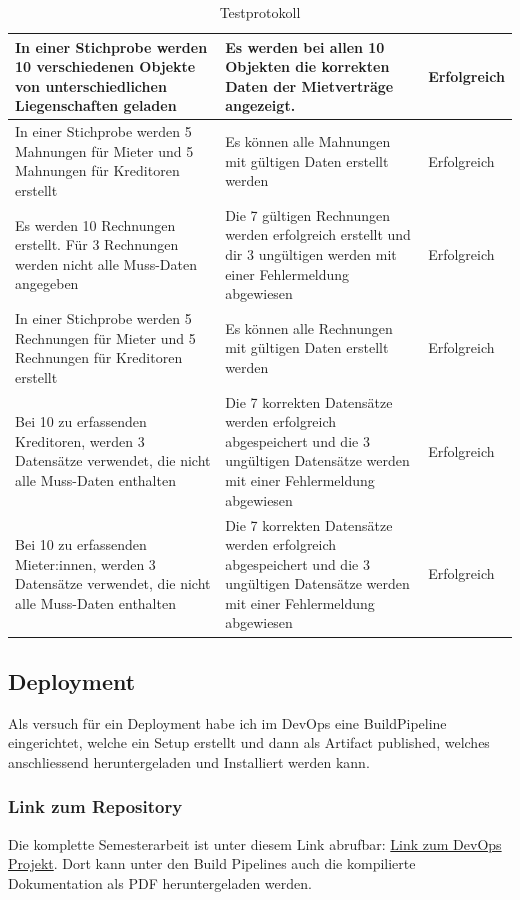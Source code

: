 \begin{table}[H]
\begin{tabulary}{1.0\textwidth}{|L|L|m{2cm}|}
    \hline
    In einer Stichprobe werden 10 verschiedenen Objekte von unterschiedlichen Liegenschaften geladen & Es werden bei allen 10 Objekten die korrekten Daten der Mietverträge angezeigt. &  Erfolgreich\\
    \hline
    In einer Stichprobe werden 5 Mahnungen für Mieter und 5 Mahnungen für Kreditoren erstellt & Es können alle Mahnungen mit gültigen Daten erstellt werden & Erfolgreich\\
    \hline
    Es werden 10 Rechnungen erstellt. Für 3 Rechnungen werden nicht alle Muss-Daten angegeben & Die 7 gültigen Rechnungen werden erfolgreich erstellt und dir 3 ungültigen werden mit einer Fehlermeldung abgewiesen &  Erfolgreich\\
    \hline   
    In einer Stichprobe werden 5 Rechnungen für Mieter und 5 Rechnungen für Kreditoren erstellt & Es können alle Rechnungen mit gültigen Daten erstellt werden &  Erfolgreich\\
    \hline
    Bei 10 zu erfassenden Kreditoren, werden 3 Datensätze verwendet, die nicht alle Muss-Daten enthalten & Die 7 korrekten Datensätze werden erfolgreich abgespeichert und die 3 ungültigen Datensätze werden mit einer Fehlermeldung abgewiesen &  Erfolgreich\\
    \hline
    Bei 10 zu erfassenden Mieter:innen, werden 3 Datensätze verwendet, die nicht alle Muss-Daten enthalten & Die 7 korrekten Datensätze werden erfolgreich abgespeichert und die 3 ungültigen Datensätze werden mit einer Fehlermeldung abgewiesen &  Erfolgreich\\
    \hline
  \end{tabulary}
  \caption{Testprotokoll}
\end{table}

\subsection{Deployment}
Als versuch für ein Deployment habe ich im DevOps eine BuildPipeline eingerichtet, welche ein Setup erstellt und dann als Artifact published, welches anschliessend heruntergeladen und Installiert werden kann. 

\subsubsection{Link zum Repository}
Die komplette Semesterarbeit ist unter diesem Link abrufbar: \href{https://dev.azure.com/michaelneuhaus/Semesterarbeit/}{Link zum DevOps Projekt}. Dort kann unter den Build Pipelines auch die kompilierte Dokumentation als PDF heruntergeladen werden.